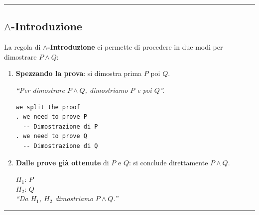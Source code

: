 \documentclass[
  a4paper,
]{article}
\begin{document}
\par\noindent\rule{\linewidth}{0.4pt}\par\vspace{6pt}

\hypertarget{land-introduzione}{%
\subsection{\texorpdfstring{\(\land\)-Introduzione}{\textbackslash land-Introduzione}}\label{land-introduzione}}

La regola di \(\land\)\textbf{-Introduzione} ci permette di procedere in
due modi per dimostrare \(P \land Q\):

\begin{enumerate}
\def\labelenumi{\arabic{enumi}.}
\item
  \textbf{Spezzando la prova}: si dimostra prima \(P\) poi \(Q\).

  \begin{examplebox}[Esempio]

  \emph{``Per dimostrare \(P \land Q\), dimostriamo \(P\) e poi
  \(Q\)''.}

  \end{examplebox}

  \begin{examplebox}

\begin{lstlisting}
we split the proof
. we need to prove P
  -- Dimostrazione di P
. we need to prove Q
  -- Dimostrazione di Q
\end{lstlisting}

  \end{examplebox}
\item
  \textbf{Dalle prove già ottenute} di \(P\) e \(Q\): si conclude
  direttamente \(P \land Q\).

  \begin{examplebox}[Esempio]

  \(H_1\): \(P\)\\
  \(H_2\): \(Q\)\\
  \emph{``Da \(H_1\), \(H_2\) dimostriamo \(P \land Q\).''}

  \end{examplebox}
\end{enumerate}

\par\noindent\rule{\linewidth}{0.4pt}\par\vspace{6pt}
\end{document}
